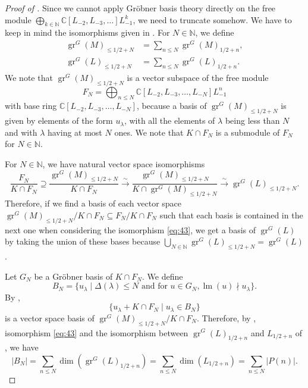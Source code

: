 \documentclass[a4paper, 12pt, reqno]{amsart}
\theoremstyle{remark}
\numberwithin{equation}{subsection}
\DeclareMathOperator{\gr}{gr}
\DeclareMathOperator{\lm}{lm}
\begin{document}
\begin{proof}[Proof of ]
  Since we cannot apply Gr\"{o}bner basis theory directly on the free module $\bigoplus_{k \in \mathbb{N}}\mathbb{C}[L_{-2}, L_{-3}, \dots]L_{-1}^k$, we need to truncate somehow.
  We have to keep in mind the isomorphisms given in .
  For $N \in \mathbb{N}$, we define
  \begin{align*}
    \gr^G(M)_{\le 1/2 + N} &= \sum_{n \le N}\gr^G(M)_{1/2 + n}, \\
    \gr^G(L)_{\le 1/2 + N} &= \sum_{n \le N}\gr^G(L)_{1/2 + n}.
  \end{align*}
  We note that $\gr^G(M)_{\le 1/2 + N}$ is a vector subspace of the free module
  \begin{equation*}
    F_N = \bigoplus_{n \le N}\mathbb{C}[L_{-2}, L_{-3}, \dots, L_{-N}]L_{-1}^n
  \end{equation*}
  with base ring $\mathbb{C}[L_{-2}, L_{-3}, \dots, L_{-N}]$, because a basis of $\gr^G(M)_{\le 1/2 + N}$ is given by elements of the form $u_{\lambda}$, with all the elements of $\lambda$ being less than $N$ and with $\lambda$ having at most $N$ ones.
  We note that $K \cap F_N$ is a submodule of $F_N$ for $N \in \mathbb{N}$.

  For $N \in \mathbb{N}$, we have natural vector space isomorphisms
  \begin{equation}
    \label{eq:43}
    \frac{F_N}{K \cap F_N} \supseteq \frac{\gr^G(M)_{\le 1/2 + N}}{K \cap F_N} \xrightarrow{\sim} \frac{\gr^G(M)_{\le 1/2 + N}}{K \cap \gr^G(M)_{\le 1/2 + N}} \xrightarrow{\sim} \gr^G(L)_{\le 1/2 + N}.
  \end{equation}
  Therefore, if we find a basis of each vector space $\gr^G(M)_{\le 1/2 + N}/K \cap F_N \subseteq F_N/K \cap F_N$ such that each basis is contained in the next one when considering the isomorphism \eqref{eq:43}, we get a basis of $\gr^G(L)$ by taking the union of these bases because $\bigcup_{N \in \mathbb{N}}\gr^G(L)_{\le 1/2 + N} = \gr^G(L)$.

  Let $G_N$ be a Gr\"{o}bner basis of $K \cap F_N$.
  We define
  \begin{equation*}
    B_N = \{u_{\lambda} \mid \Delta(\lambda) \le N\text{ and for }u \in G_N, \lm(u) \nmid u_{\lambda}\}.
  \end{equation*}
  By \cite[Proposition 3.6.4]{adams_introduction_1994},
  \begin{equation}
    \label{eq:44}
    \{u_{\lambda} + K \cap F_N \mid u_{\lambda} \in B_N\}
  \end{equation}
  is a vector space basis of $\gr^G(M)_{\le 1/2 + N}/K \cap F_N$.
  Therefore, by , isomorphism \eqref{eq:43} and the isomorphism between $\gr^G(L)_{1/2 + n}$ and $L_{1/2 + n}$ of , we have
  \begin{equation*}
    |B_N| = \sum_{n \le N}\dim(\gr^G(L)_{1/2 + n}) = \sum_{n \le N}\dim(L_{1/2 + n}) = \sum_{n \le N}|P(n)|.
  \end{equation*}


\end{proof}
\end{document}
